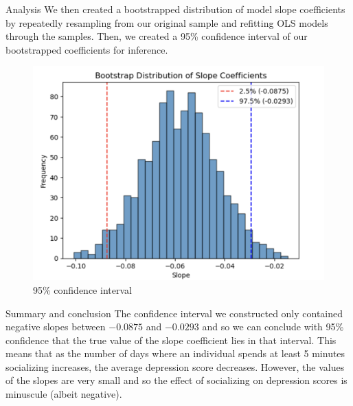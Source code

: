 \documentclass{beamer}
\begin{document}
\begin{frame}{Analysis}
    We then created a bootstrapped distribution of model slope coefficients by repeatedly resampling from our original sample and refitting OLS models through the samples. Then, we created a 95\% confidence interval of our bootstrapped coefficients for inference.
    \begin{figure}
        \centering
        \includegraphics[width=0.5\linewidth]{95CI.png}
        \caption{95\% confidence interval}
        \label{fig:enter-label}
    \end{figure}
\end{frame}

\begin{frame}{Summary and conclusion}
The confidence interval we constructed only contained negative slopes between $-0.0875$ and $-0.0293$ and so we can conclude with 95\% confidence that the true value of the slope coefficient lies in that interval. This means that as the number of days where an individual spends at least 5 minutes socializing increases, the average depression score decreases. However, the values of the slopes are very small and so the effect of socializing on depression scores is minuscule (albeit negative).
    
\end{frame}
\end{document}
